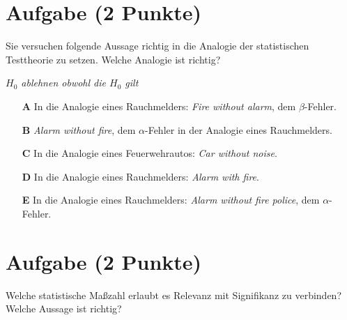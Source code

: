 \documentclass[a4paper, 9pt]{scrartcl}\usepackage[]{graphicx}\usepackage[]{xcolor}
\begin{document}

\section{Aufgabe \hfill (2 Punkte)}



Sie versuchen folgende Aussage richtig in die Analogie der statistischen Testtheorie zu setzen. Welche Analogie ist richtig?

\begin{center}
\textit{$H_0$ ablehnen obwohl die $H_0$ gilt}
\end{center}



\begin{enumerate}
\item [\textbf{A} \msquare] In die Analogie eines Rauchmelders: \textit{Fire without alarm}, dem $\beta$-Fehler.
\item [\textbf{B} \msquare] \textit{Alarm without fire}, dem $\alpha$-Fehler in der Analogie eines Rauchmelders.
\item [\textbf{C} \msquare] In die Analogie eines Feuerwehrautos: \textit{Car without noise}.
\item [\textbf{D} \msquare] In die Analogie eines Rauchmelders: \textit{Alarm with fire}.
\item [\textbf{E} \msquare] In die Analogie eines Rauchmelders: \textit{Alarm without fire police}, dem $\alpha$-Fehler.
\end{enumerate}

\section{Aufgabe \hfill (2 Punkte)}



Welche statistische Maßzahl erlaubt es Relevanz mit Signifikanz zu verbinden? Welche Aussage ist richtig?
\end{document}
